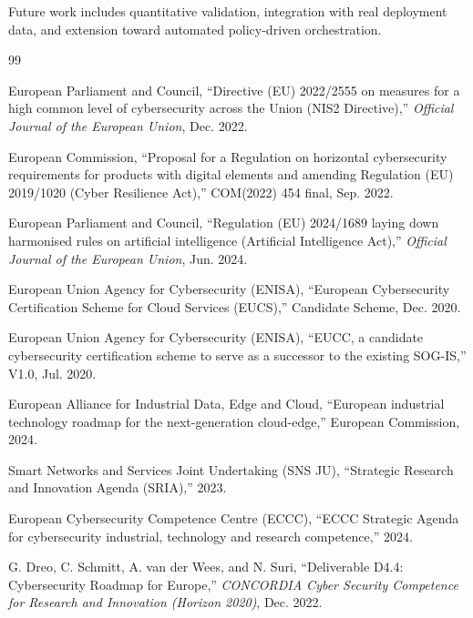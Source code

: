 \documentclass{ieeeaccess}
\begin{document}
Future work includes quantitative validation, integration with real deployment data, and extension toward automated policy-driven orchestration.

\begin{thebibliography}{99}

European Parliament and Council, ``Directive (EU) 2022/2555 on measures for a high common level of cybersecurity across the Union (NIS2 Directive),''  \textit{Official Journal of the European Union}, Dec. 2022.

European Commission, ``Proposal for a Regulation on horizontal cybersecurity requirements for products with digital elements and amending Regulation (EU) 2019/1020 (Cyber Resilience Act),''  COM(2022) 454 final, Sep. 2022.

European Parliament and Council, ``Regulation (EU) 2024/1689 laying down harmonised rules on artificial intelligence (Artificial Intelligence Act),''  \textit{Official Journal of the European Union}, Jun. 2024.

European Union Agency for Cybersecurity (ENISA), ``European Cybersecurity Certification Scheme for Cloud Services (EUCS),''  Candidate Scheme, Dec. 2020.

European Union Agency for Cybersecurity (ENISA), ``EUCC, a candidate cybersecurity certification scheme to serve as a successor to the existing SOG-IS,''  V1.0, Jul. 2020.

European Alliance for Industrial Data, Edge and Cloud, ``European industrial technology roadmap for the next-generation cloud-edge,''  European Commission, 2024.

Smart Networks and Services Joint Undertaking (SNS JU), ``Strategic Research and Innovation Agenda (SRIA),''  2023.

European Cybersecurity Competence Centre (ECCC), ``ECCC Strategic Agenda for cybersecurity industrial, technology and research competence,''  2024.

G. Dreo, C. Schmitt, A. van der Wees, and N. Suri, ``Deliverable D4.4: Cybersecurity Roadmap for Europe,''  \textit{CONCORDIA Cyber Security Competence for Research and Innovation (Horizon 2020)}, Dec. 2022.

\end{thebibliography}
\end{document}
